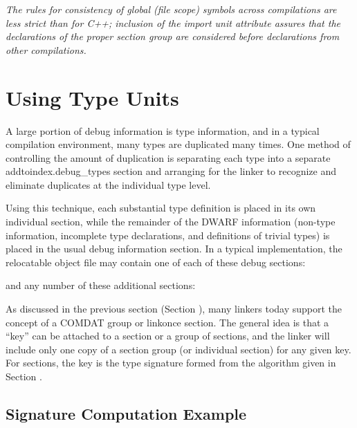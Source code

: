 \textit{The  rules for consistency of global (file scope) symbols
across compilations are less strict than for C++; inclusion
of the import unit attribute assures that the declarations of
the proper section group are considered before declarations
from other compilations.}


\section{Using Type Units}
\label{app:usingtypeunits}

A large portion of debug information is type information, and
in a typical compilation environment, many types are duplicated
many times. One method of controlling the amount of duplication
is separating each type into a separate 
addtoindex{.debug\_types} section
and arranging for the linker to recognize and eliminate
duplicates at the individual type level.

Using this technique, each substantial type definition is
placed in its own individual section, while the remainder
of the DWARF information (non-type information, incomplete
type declarations, and definitions of trivial types) is
placed in the usual debug information section. In a typical
implementation, the relocatable object file may contain one
of each of these debug sections:

\begin{alltt}
\end{alltt}

and any number of these additional sections:

\begin{alltt}
\end{alltt}

As discussed in the previous section 
(Section ), 
many
linkers today support the concept of a COMDAT group or
linkonce section. The general idea is that a ``key'' can be
attached to a section or a group of sections, and the linker
will include only one copy of a section group (or individual
section) for any given key. For 
 sections, the
key is the type signature formed from the algorithm given in
Section .

\subsection{Signature Computation Example}
\label{app:signaturecomputationexample}

